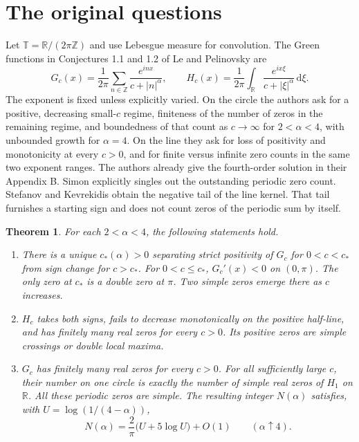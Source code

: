 \documentclass[11pt]{article}
\theoremstyle{plain}\newtheorem{theorem}{Theorem}[section]\newtheorem{lemma}[theorem]{Lemma}\newtheorem{corollary}[theorem]{Corollary}\newtheorem{proposition}[theorem]{Proposition}
\newcommand{\R}{\mathbb R}\newcommand{\T}{\mathbb T}\newcommand{\Z}{\mathbb Z}
\newcommand{\dd}{\,\mathrm d}
\numberwithin{equation}{section}
\begin{document}
\section{The original questions}
Let $\T=\R/(2\pi\Z)$ and use Lebesgue measure for convolution. The Green functions in Conjectures 1.1 and 1.2 of Le and Pelinovsky \cite{lp} are
\begin{equation}\label{def}
 G_c(x)=\frac1{2\pi}\sum_{n\in\Z}\frac{e^{inx}}{c+|n|^\alpha},
 \qquad H_c(x)=\frac1{2\pi}\int_{\R}\frac{e^{ix\xi}}{c+|\xi|^\alpha}\dd\xi .
\end{equation}
The exponent is fixed unless explicitly varied. On the circle the authors ask for a positive, decreasing small-$c$ regime, finiteness of the number of zeros in the remaining regime, and boundedness of that count as $c\to\infty$ for $2<\alpha<4$, with unbounded growth for $\alpha=4$. On the line they ask for loss of positivity and monotonicity at every $c>0$, and for finite versus infinite zero counts in the same two exponent ranges. The authors already give the fourth-order solution in their Appendix B. Simon \cite[Remark (e)]{simon} explicitly singles out the outstanding periodic zero count. Stefanov and Kevrekidis \cite[Lemma 6]{sk} obtain the negative tail of the line kernel. That tail furnishes a starting sign and does not count zeros of the periodic sum by itself.
\begin{theorem}\label{main}
For each $2<\alpha<4$, the following statements hold.
\begin{enumerate}
\item There is a unique $c_*(\alpha)>0$ separating strict positivity of $G_c$ for $0<c<c_*$ from sign change for $c>c_*$. For $0<c\le c_*$, $G_c'(x)<0$ on $(0,\pi)$. The only zero at $c_*$ is a double zero at $\pi$. Two simple zeros emerge there as $c$ increases.
\item $H_c$ takes both signs, fails to decrease monotonically on the positive half-line, and has finitely many real zeros for every $c>0$. Its positive zeros are simple crossings or double local maxima.
\item $G_c$ has finitely many real zeros for every $c>0$. For all sufficiently large $c$, their number on one circle is exactly the number of simple real zeros of $H_1$ on $\R$. All these periodic zeros are simple. The resulting integer $N(\alpha)$ satisfies, with $U=\log (1/(4-\alpha))$,
\[
             N(\alpha)=\frac{2}{\pi}\bigl(U+5\log U\bigr)+O(1)
             \qquad(\alpha\uparrow4).
\]
\end{enumerate}
\end{theorem}
\end{document}
